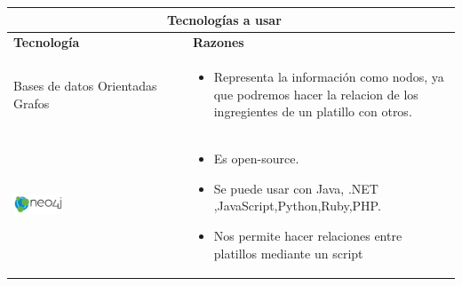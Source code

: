     \newpage
\begin{table}[b!]
    \centering
    \vspace{33mm}
      \begin{tabular}{|p{2cm}|ll}
        \hline
        
        \multicolumn{2}{|c|}{{\bf Tecnologías a usar}} \\ 
        \hline
          \multicolumn{1}{|p{4cm}|}{{\bf Tecnología}} & 
		  \multicolumn{1}{p{10cm}|}{{\bf Razones}}\\

        \hline
          \multicolumn{1}{|p{5cm}|}{Bases de datos Orientadas  Grafos} & 
          \multicolumn{2}{p{10cm}|}{\begin{itemize}
          \vspace{-5mm}
         \item Representa la información como nodos, ya que podremos hacer la relacion de los ingregientes de un platillo con otros.
         
       
      \end{itemize}} \\
        \hline

          \multicolumn{1}{|p{5cm}|}{\includegraphics[width=0.3\textwidth]{images/neo4j}} & 
          \multicolumn{1}{p{10cm}|}{
          \begin{itemize}
          \vspace{-15mm}
       \item Es open-source.         
        \item Se puede usar con Java, .NET ,JavaScript,Python,Ruby,PHP.
        \item Nos permite hacer relaciones entre platillos mediante un script


\end{itemize}}
\end{tabular}
\end{table}
